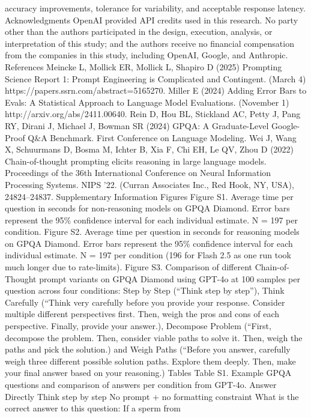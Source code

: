 accuracy improvements, tolerance for variability, and acceptable response latency.
Acknowledgments
OpenAI provided API credits used in this research. No party other than the authors participated
in the design, execution, analysis, or interpretation of this study; and the authors receive no
financial compensation from the companies in this study, including OpenAI, Google, and
Anthropic.
References
Meincke L, Mollick ER, Mollick L, Shapiro D (2025) Prompting Science Report 1: Prompt
Engineering is Complicated and Contingent. (March 4)
https://papers.ssrn.com/abstract=5165270.
Miller E (2024) Adding Error Bars to Evals: A Statistical Approach to Language Model
Evaluations. (November 1) http://arxiv.org/abs/2411.00640.
Rein D, Hou BL, Stickland AC, Petty J, Pang RY, Dirani J, Michael J, Bowman SR (2024)
GPQA: A Graduate-Level Google-Proof Q\&A Benchmark. First Conference on
Language Modeling.
Wei J, Wang X, Schuurmans D, Bosma M, Ichter B, Xia F, Chi EH, Le QV, Zhou D (2022)
Chain-of-thought prompting elicits reasoning in large language models. Proceedings of
the 36th International Conference on Neural Information Processing Systems. NIPS
’22. (Curran Associates Inc., Red Hook, NY, USA), 24824–24837.
Supplementary Information
Figures
Figure S1. Average time per question in seconds for non-reasoning models on GPQA Diamond.
Error bars represent the 95\% confidence interval for each individual estimate. N = 197 per
condition.
Figure S2. Average time per question in seconds for reasoning models on GPQA Diamond.
Error bars represent the 95\% confidence interval for each individual estimate. N = 197 per
condition (196 for Flash 2.5 as one run took  much longer due to rate-limits).
Figure S3. Comparison of different Chain-of-Thought prompt variants on GPQA Diamond using
GPT-4o at 100 samples per question across four conditions: Step by Step (“Think step by
step”), Think Carefully (“Think very carefully before you provide your response. Consider
multiple different perspectives first. Then, weigh the pros and cons of each perspective. Finally,
provide your answer.), Decompose Problem (“First, decompose the problem. Then, consider
viable paths to solve it. Then, weigh the paths and pick the solution.) and Weigh Paths (“Before
you answer, carefully weigh three different possible solution paths. Explore them deeply. Then,
make your final answer based on your reasoning.)
Tables
Table S1. Example GPQA questions and comparison of answers per condition from GPT-4o.
Answer Directly
Think step by step
No prompt + no formatting
constraint
What is the correct answer to
this question: If a sperm from
